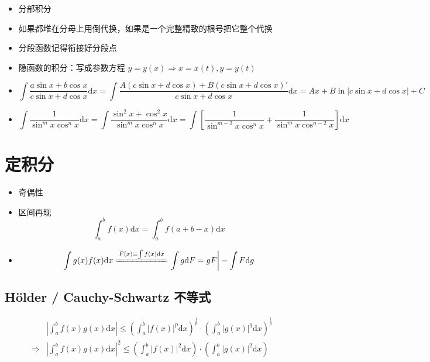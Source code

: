 \documentclass{article}
\begin{document}
\begin{itemize}
    \item 分部积分
    \item 如果都堆在分母上用倒代换，如果是一个完整精致的根号把它整个代换
    \item 分段函数记得衔接好分段点
    \item 隐函数的积分：写成参数方程 $y = y(x) \Rightarrow x = x(t), y = y(t)$
    \item \begin{equation}
              \int \frac{a \sin x + b \cos x}{c \sin x + d \cos x} \mathrm{d}x = \int \frac{A (c \sin x + d \cos x) + B (c \sin x + d \cos x)'}{c \sin x + d \cos x} \mathrm{d}x = A x + B \ln |c \sin x + d \cos x| + C
          \end{equation}
    \item \begin{equation}
              \int \frac{1}{\sin^m x \cos^n x} \mathrm{d}x = \int \frac{\sin^2x + \cos^2 x}{\sin^m x \cos^n x} \mathrm{d}x = \int \left[\frac{1}{\sin^{m-2} x \cos^n x} + \frac{1}{\sin^m x \cos^{n-2} x}\right] \mathrm{d}x
          \end{equation}
\end{itemize}

\section{定积分}

\begin{itemize}
    \item 奇偶性
    \item 区间再现 \begin{equation}
              \int_a^b f(x) \mathrm{d}x = \int_a^b f(a + b - x) \mathrm{d}x
          \end{equation}
    \item \begin{equation}
              \int g(x) f(x) \mathrm{d}x \xlongequal{F(x) \equiv \int f(x) \mathrm{d}x} \left.\int g \mathrm{d}F = g F\right| - \int F \mathrm{d}g
          \end{equation}
\end{itemize}

\subsection{H\"{o}lder / Cauchy-Schwartz 不等式}

\begin{align}
                & \left| \int_a^b f(x) g(x) \mathrm{d} x \right| \leq \left( \int_a^b |f(x)|^p \mathrm{d} x \right)^{\frac{1}{p}} \cdot \left( \int_a^b |g(x)|^q \mathrm{d} x \right)^{\frac{1}{q}} \\
    \Rightarrow & \left| \int_a^b f(x) g(x) \mathrm{d} x \right|^2 \leq \left( \int_a^b |f(x)|^2 \mathrm{d} x \right) \cdot \left( \int_a^b |g(x)|^2 \mathrm{d} x \right)
\end{align}
\end{document}
